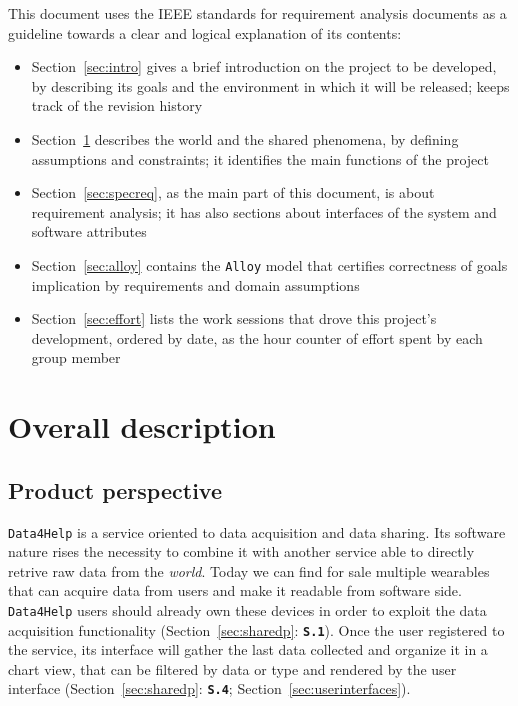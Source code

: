 \documentclass[12pt]{article}
\begin{document}
    This document uses the IEEE standards for requirement analysis documents as a guideline towards a clear and logical explanation of its contents:
    \begin{itemize}
      \item Section~\ref{sec:intro} gives a brief introduction on the project to be developed, by describing its goals and the environment in which it will be released; keeps track of the revision history
      \item Section~\ref{sec:overdesc} describes the world and the shared phenomena, by defining assumptions and constraints; it identifies the main functions of the project
      \item Section~\ref{sec:specreq}, as the main part of this document, is about requirement analysis; it has also sections about interfaces of the system and software attributes
      \item Section~\ref{sec:alloy} contains the \texttt{Alloy} model that certifies correctness of goals implication by requirements and domain assumptions
      \item Section~\ref{sec:effort} lists the work sessions that drove this project's development, ordered by date, as the hour counter of effort spent by each group member
    \end{itemize}

\clearpage
\section{Overall description}
\label{sec:overdesc}

  \subsection{Product perspective}

    \texttt{Data4Help} is a service oriented to data acquisition and data sharing. Its software nature rises the necessity to combine it with another service able to directly retrive raw data from the \textit{world}. Today we can find for sale multiple wearables  that can acquire data from users and make it readable from software side. \texttt{Data4Help} users should already own these devices in order to exploit the data acquisition functionality (Section~\ref{sec:sharedp}: \textbf{\texttt{S.1}}). Once the user registered to the service, its interface will gather the last data collected and organize it in a chart view, that can be filtered by data or type and rendered by the user interface (Section~\ref{sec:sharedp}: \textbf{\texttt{S.4}}; Section~\ref{sec:userinterfaces}).
\end{document}
